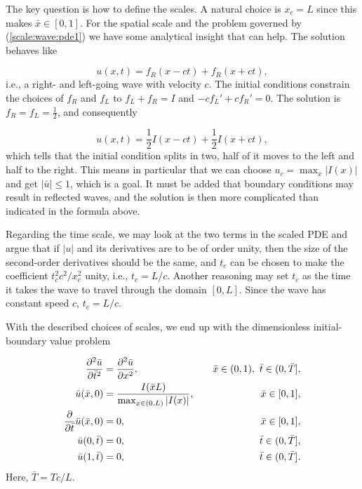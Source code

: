 \documentclass[graybox,envcountchap,sectrefs,final]{svmonodo}
\begin{document}
The key question is how to define the scales.
A natural choice is $x_c=L$ since this makes $\bar x\in [0,1]$.
For the spatial scale and the problem governed by
(\ref{scale:wave:pde1}) we
have some analytical insight that can help.
The solution behaves like

\begin{equation}
u(x,t) = f_R(x-ct) + f_R(x+ct),
\label{scale:wave:pde:sol:general}
\end{equation}
i.e., a right- and left-going wave with velocity $c$. The initial
conditions constrain the choices of $f_R$ and $f_L$ to $f_L + f_R=I$
and $-cf_L' + cf_R' = 0$. The solution is $f_R = f_L = \frac{1}{2}$,
and consequently

\[
u(x,t) = \frac{1}{2}I(x-ct) + \frac{1}{2}I(x+ct),
\]
which tells that the initial condition splits in two, half of it moves
to the left and half to the right.
This means in particular that we can choose $u_c=\max_x |I(x)|$
and get $|\bar u|\leq 1$, which is a goal. It must be added that
boundary conditions may result in reflected waves, and the solution is
then more complicated than indicated in the formula above.

Regarding the time scale, we may look at the two terms in the scaled
PDE and argue that if $|u|$ and its derivatives are to be of order unity,
then the size of the second-order derivatives should be the same, and
$t_c$ can be chosen to make the coefficient $t_c^2 c^2 /x_c^2$ unity,
i.e., $t_c=L/c$.
Another reasoning may set $t_c$ as the time it takes the wave
to travel through the domain $[0,L]$. Since the wave has constant
speed $c$, $t_c = L/c$.

With the described choices of scales,
we end up with the dimensionless initial-boundary value problem

\begin{align}
\frac{\partial^2 \bar u}{\partial \bar t^2} &=
{\partial^2 \bar u\over\partial x^2}, \quad & \bar x\in (0,1),\ \bar t\in (0,\bar T],
\label{scale:wave:pde1:d}\\ 
\bar u(\bar x,0) &= \frac{I(\bar x L)}{\max_{x\in(0,L)} |I(x)|},
\quad &\bar x\in [0,1],
\label{scale:wave:pde1:ic:u:d}\\ 
{\partial\over\partial \bar t}\bar u(\bar x,0) &= 0,
\quad & \bar x\in [0,1],
\label{scale:wave:pde1:ic:ut:d}\\ 
\bar u(0,\bar t) & = 0,
\quad  &\bar t\in (0,\bar T],
\label{scale:wave:pde1:bc:0:d}\\ 
\bar u(1,\bar t) & = 0,
\quad  &\bar t\in (0,\bar T].
\label{scale:wave:pde1:bc:L:d}
\end{align}
Here, $\bar T = Tc/L$.
\end{document}
